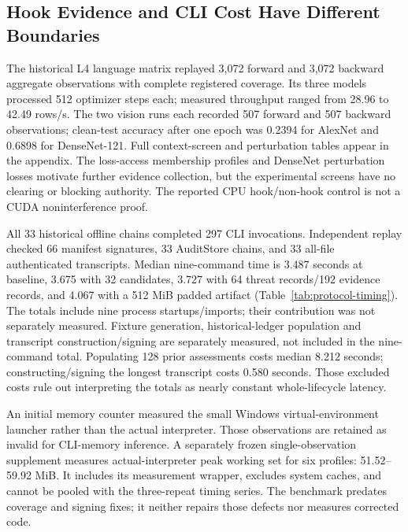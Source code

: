 \documentclass[conference,compsoc]{IEEEtran}
\begin{document}
\subsection{Hook Evidence and CLI Cost Have Different Boundaries}
The historical L4 language matrix replayed 3,072 forward and 3,072 backward
aggregate observations with complete registered coverage. Its three models
processed 512 optimizer steps each; measured throughput ranged from
28.96 to 42.49 rows/s. The two vision runs each recorded 507 forward and
507 backward observations; clean-test accuracy after one epoch was 0.2394
for AlexNet and 0.6898 for DenseNet-121. Full context-screen and perturbation
tables appear in the appendix. The loss-access membership profiles and
DenseNet perturbation losses motivate further evidence collection, but the
experimental screens have no clearing or blocking authority. The reported
CPU hook/non-hook control is not a CUDA noninterference proof.

\ProtocolTimingTable
All 33 historical offline chains completed 297 CLI invocations. Independent
replay checked 66 manifest signatures, 33 AuditStore chains, and 33 all-file
authenticated transcripts. Median nine-command time is 3.487 seconds at
baseline, 3.675 with 32 candidates, 3.727 with 64 threat records/192 evidence
records, and 4.067 with a 512 MiB padded artifact
(Table~\ref{tab:protocol-timing}). The totals include nine process
startups/imports; their contribution was not separately measured.
Fixture generation, historical-ledger population and
transcript construction/signing are separately measured, not included in the
nine-command total. Populating 128 prior assessments costs median 8.212
seconds; constructing/signing the longest transcript costs 0.580 seconds.
Those excluded costs rule out interpreting the totals as nearly constant
whole-lifecycle latency.

An initial memory counter measured the small Windows virtual-environment
launcher rather than the actual interpreter. Those observations are retained
as invalid for CLI-memory inference. A separately frozen single-observation
supplement measures actual-interpreter peak working set for six profiles:
51.52--59.92 MiB. It includes its measurement wrapper, excludes system caches,
and cannot be pooled with the three-repeat timing series. The benchmark predates
coverage and signing fixes; it neither repairs those defects nor measures
corrected code.
\end{document}
